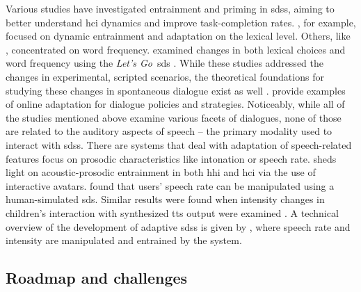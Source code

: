 Various studies have investigated entrainment and priming in \acp{sds}, aiming to better understand \ac{hci} dynamics and improve task-completion rates.
\citet{Lopes2013automated, Lopes2011primes}, for example, focused on dynamic entrainment and adaptation on the lexical level.
Others, like \citet{Nenkova2008high}, concentrated on word frequency.
\citet{Parent2010lexical} examined changes in both lexical choices and word frequency using the \emph{Let's Go}~\ac{sds} \citep{Raux2005letsgo}.
While these studies addressed the changes in experimental, scripted scenarios, the theoretical foundations for studying these changes in spontaneous dialogue exist as well \citep{Brennan1996lexical}.
\citet{Gasic2013policy, Levin2000stochastic} provide examples of online adaptation for dialogue policies and strategies.
Noticeably, while all of the studies mentioned above examine various facets of dialogues, none of those are related to the auditory aspects of speech -- the primary modality used to interact with \acp{sds}.
There are systems that deal with adaptation of speech-related features focus on prosodic characteristics like intonation or speech rate.
\citet{Levitan2014acoustic} sheds light on acoustic-prosodic entrainment in both \ac{hhi} and \ac{hci} via the use of interactive avatars.
\citet{Bell2003prosodic} found that users' speech rate can be manipulated using a human-simulated \ac{sds}.
Similar results were found when intensity changes in children's interaction with synthesized \ac{tts} output were examined \citep{Coulston2002amplitude}.
A technical overview of the development of adaptive \acp{sds} is given by \citet{Levitan2016implementing}, where speech rate and intensity are manipulated and entrained by the system.

\subsection{Roadmap and challenges}
\label{subsec:roadmap_and_challenges}

